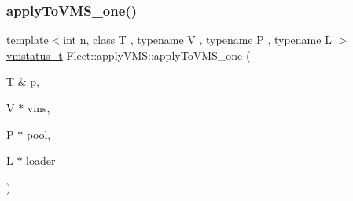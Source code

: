 \mbox{\label{namespace_fleet_1_1apply_v_m_s_a7961ca5a819b4db7e4261f7ff18d272d}} 
\subsubsection{\texorpdfstring{apply\+To\+V\+M\+S\+\_\+one()}{applyToVMS\_one()}}
{\footnotesize\ttfamily template$<$int n, class T , typename V , typename P , typename L $>$ \\
\hyperlink{_instruction_8h_a6202215407ab29590bb936ca2996cf64}{vmstatus\+\_\+t} Fleet\+::apply\+V\+M\+S\+::apply\+To\+V\+M\+S\+\_\+one (\begin{DoxyParamCaption}\item[{T \&}]{p,  }\item[{V $\ast$}]{vms,  }\item[{P $\ast$}]{pool,  }\item[{L $\ast$}]{loader }\end{DoxyParamCaption})\hspace{0.3cm}{\ttfamily [inline]}}

